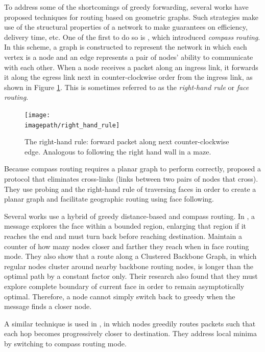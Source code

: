 \documentclass[conference]{IEEEtran}
\newcommand{\imagepath}{../../images/external/location_routing}
\begin{document}
To address some of the shortcomings of greedy forwarding, several works have proposed techniques for routing based on geometric graphs.
Such strategies make use of the structural properties of a network to make guarantees on efficiency, delivery time, etc.
One of the first to do so is \cite{Kranakis99compassrouting}, which introduced \emph{compass routing}.
In this scheme, a graph is constructed to represent the network in which each vertex is a node and an edge represents a pair of nodes' ability to communicate with each other.
When a node receives a packet along an ingress link, it forwards it along the egress link next in counter-clockwise order from the ingress link, as shown in Figure \ref{fig:right-hand-rule}.
This is sometimes referred to as the \emph{right-hand rule} or \emph{face routing}.

\begin{figure}
\label{fig:right-hand-rule}
\centering
\texttt{[image: \\imagepath/right\_hand\_rule]}
\caption{The right-hand rule: forward packet along next counter-clockwise edge. Analogous to following the right hand wall in a maze.}
\end{figure}

Because compass routing requires a planar graph to perform correctly, \cite{Kim:2005:GRM:1251203.1251219} proposed a protocol that eliminates cross-links (links between two pairs of nodes that cross).
They use probing and the right-hand rule of traversing faces in order to create a planar graph and facilitate geographic routing using face following.

Several works use a hybrid of greedy distance-based and compass routing.
In \cite{Kuhn2003}, a message explores the face within a bounded region, enlarging that region if it reaches the end and must turn back before reaching destination.
Maintain a counter of how many nodes closer and farther they reach when in face routing mode.
They also show that a route along a Clustered Backbone Graph, in which regular nodes cluster around nearby backbone routing nodes, is longer than the optimal path by a constant factor only.
Their research also found that they must explore complete boundary of current face in order to remain asymptotically optimal.
Therefore, a node cannot simply switch back to greedy when the message finds a closer node.

A similar technique is used in \cite{Karp2000}, in which nodes greedily routes packets such that each hop becomes progressively closer to destination.
They address local minima by switching to compass routing mode.
\end{document}
